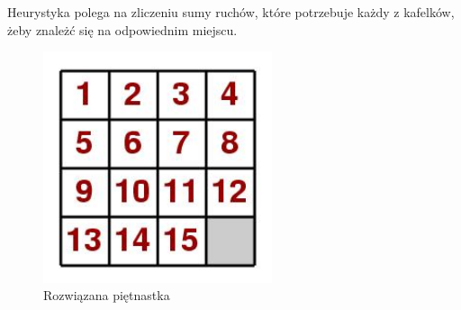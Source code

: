 \documentclass{classrep}
\begin{document}
{\begin{itemize}
\begin{itemize}
                Heurystyka polega na zliczeniu sumy ruchów, które potrzebuje każdy z kafelków, żeby znależć się na odpowiednim miejscu.
            \end{itemize}
        \end{itemize}
        \begin{figure}[!ht]
            \centering
            \includegraphics[width=0.6\textwidth,keepaspectratio]
            {15}
            \caption{Rozwiązana piętnastka}
            \label{fig:Rozwiązana piętnastka}
        \end{figure}
    }\label{sec:wprowadzenie}
\end{document}
